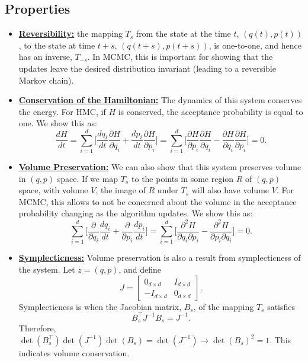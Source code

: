 \documentclass[twoside]{article}
\begin{document}
\subsection{Properties}
\begin{itemize}
    \item \underline{\textbf{Reversibility:}} the mapping $T_s$ from the state at the time $t$, $(q(t),p(t))$, to the state at time $t+s$, $(q(t+s),p(t+s))$, is one-to-one, and hence has an inverse, $T_{-s}$. In MCMC, this is important for showing that the updates leave the desired distribution invariant (leading to a reversible Markov chain).
    \item \underline{\textbf{Conservation of the Hamiltonian:}} The dynamics of this system conserves the energy. For HMC, if $H$ is conserved, the acceptance probability is equal to one. We show this as:
    $$\frac{dH}{dt} = \sum_{i=1}^d \Bigg[\frac{dq_i}{dt}\frac{\partial H}{\partial q_i} + \frac{dp_i}{dt}\frac{\partial H}{\partial p_i}\Bigg] = \sum_{i=1}^d \Bigg[\frac{\partial H}{\partial p_i}\frac{\partial H}{\partial q_i} - \frac{\partial H}{\partial q_i}\frac{\partial H}{\partial p_i}\Bigg] = 0.$$
    \item \underline{\textbf{Volume Preservation:}} We can also show that this system preserves volume in $(q,p)$ space. If we map $T_s$ to the points in some region $R$ of $(q,p)$ space, with volume $V$, the image of $R$ under $T_s$ will also have volume $V$. For MCMC, this allows to not be concerned about the volume in the acceptance probability changing as the algorithm updates. We show this as:
    $$ \sum_{i=1}^d \Bigg[\frac{\partial}{\partial q_i}\frac{dq_i}{dt} + \frac{\partial }{\partial p_i}\frac{dp_i}{dt}\Bigg] = \sum_{i=1}^d \Bigg[\frac{\partial^2 H}{\partial q_i \partial p_i} - \frac{\partial^2 H }{\partial p_i \partial q_i}\Bigg] = 0.$$
    \item \underline{\textbf{Symplecticness:}} Volume preservation is also a result from symplecticness of the system. Let $z=(q,p)$, and define
    $$J = \begin{bmatrix}
    0_{d \times d} & I_{d \times d} \\ -I_{d \times d} & 0_{d \times d}
    \end{bmatrix}.$$
    Symplecticness is when the Jacobian matrix, $B_s$, of the mapping $T_s$ satisfies
    $$B_s^\top J^{-1} B_s = J^{-1}.$$
    Therefore, $\det (B_s^\top) \det (J^{-1}) \det (B_s) = \det (J^{-1}) \rightarrow \det (B_s)^2 =1.$ This indicates volume conservation. 
\end{itemize}
\end{document}
